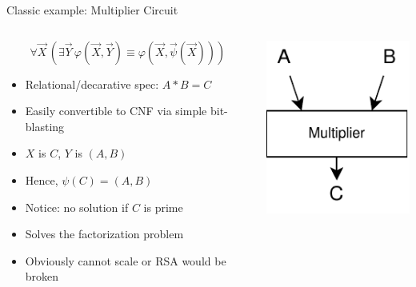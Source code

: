 \documentclass[aspectratio=169]{beamer}
\begin{document}
\begin{frame}{Classic example: Multiplier Circuit}
\begin{columns}
\begin{column}{0.68\textwidth}
        \[
            \forall \vec{X}\, \left( \exists \vec{Y}\, \varphi(\vec{X}, \vec{Y}) \equiv \varphi(\vec{X}, \vec{\psi}(\vec{X})) \right)
        \]
\begin{itemize}
    \item Relational/decarative spec: $A * B = C$
    \item Easily convertible to CNF via simple bit-blasting
    \item $X$ is $C$, $Y$ is $(A, B)$
    \item Hence, $\psi(C) = (A, B)$
    \item Notice: no solution if $C$ is prime
    \item Solves the factorization problem
    \item Obviously cannot scale or RSA would be broken
\end{itemize}
\end{column}
\begin{column}{0.28\textwidth}
    \includegraphics[scale=1.2]{mult.pdf}
\end{column}
\end{columns}
\end{frame}
\end{document}
